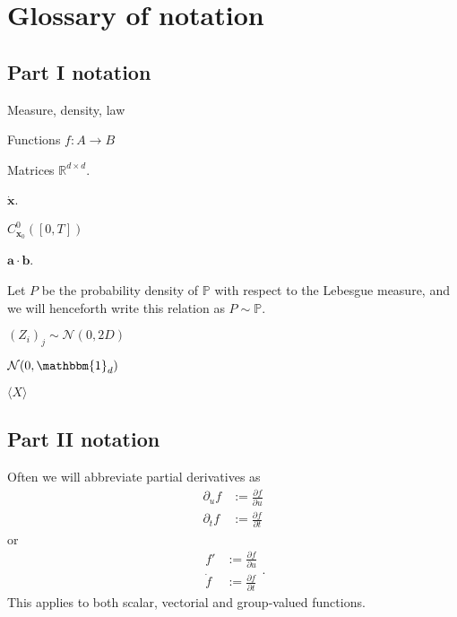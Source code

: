 \documentclass[withindex,glossary,techreport]{cam-thesis}
\begin{document}
\appendix


\chapter{Glossary of notation} \label{app:glossary of notation}

\section{Part I notation}

Measure, density, law

Functions $f : A \to B$

Matrices $\mathbb{R}^{d \times d}$.

$\dot{\mathbf{x}}$.

$C^0_{\mathbf{x}_0}([0,T])$

$\mathbf{a} \cdot \mathbf{b}$.


Let $P$ be the probability density of $\mathbb{P}$ with respect to the Lebesgue measure, and we will henceforth write this relation as $P \sim \mathbb{P}$.


$(Z_i)_j \sim \mathcal{N}(0, 2D)$

$\mathcal{N}(0, \mathbbm{1}_d)$

$\langle X \rangle $

\section{Part II notation}

Often we will abbreviate partial derivatives as
\begin{equation}
\begin{aligned}
\partial_u f & := \frac{\partial f}{\partial u} \\
\partial_t f & := \frac{\partial f}{\partial t}
\end{aligned}
\end{equation}
or
\begin{equation}
\begin{aligned}
f' & := \frac{\partial f}{\partial u} \\
\dot{f} & := \frac{\partial f}{\partial t}
\end{aligned}.
\end{equation}
This applies to both scalar, vectorial and group-valued functions.
\end{document}
